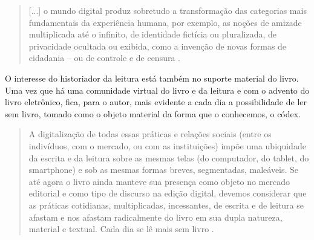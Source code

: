 \begin{quote}
[...] o mundo digital produz sobretudo a transformação das categorias mais fundamentais da experiência humana, por exemplo, as noções de amizade multiplicada até o infinito, de identidade fictícia ou pluralizada, de privacidade ocultada ou exibida, como a invenção de novas formas de cidadania – ou de controle e de censura \cite[p. 15]{chartier2019lersem}.
\end{quote}

O interesse do historiador da leitura está também no suporte material do livro. Uma vez que há uma comunidade virtual do livro e da leitura e com o advento do livro eletrônico, fica, para o autor, mais evidente a cada dia a possibilidade de ler sem livro, tomado como o objeto material da forma que o conhecemos, o códex. 

\begin{quote}
A digitalização de todas essas práticas e relações sociais (entre os indivíduos, com o mercado, ou com as instituições) impõe uma ubiquidade da escrita e da leitura sobre as mesmas telas (do computador, do tablet, do smartphone) e sob as mesmas formas breves, segmentadas, maleáveis. Se até agora o livro ainda manteve sua presença como objeto no mercado editorial e como tipo de discurso na edição digital, devemos considerar que as práticas cotidianas, multiplicadas, incessantes, de escrita e de leitura se afastam e nos afastam radicalmente do livro em sua dupla natureza, material e textual. Cada dia se lê mais sem livro \cite[p. 15–16]{chartier2019lersem}.
\end{quote}


